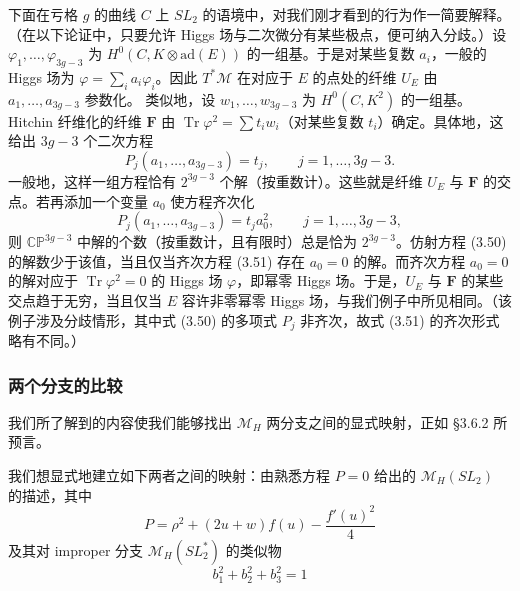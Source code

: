 \documentclass[11pt,a4paper]{article}
\newcommand{\Tr}{\operatorname{Tr}}
\begin{document}
下面在亏格 $g$ 的曲线 $C$ 上 $SL_2$ 的语境中，对我们刚才看到的行为作一简要解释。（在以下论证中，只要允许 Higgs 场与二次微分有某些极点，便可纳入分歧。）设 $\varphi_1,\dots,\varphi_{3g-3}$ 为 $H^0(C,K\otimes\mathrm{ad}(E))$ 的一组基。于是对某些复数 $a_i$，一般的 Higgs 场为 $\varphi=\sum_ia_i\varphi_i$。因此 $T^*\mathcal{M}$ 在对应于 $E$ 的点处的纤维 $U_E$ 由 $a_1,\dots,a_{3g-3}$ 参数化。
类似地，设 $w_1,\dots,w_{3g-3}$ 为 $H^0(C,K^2)$ 的一组基。Hitchin 纤维化的纤维 $\boldsymbol{F}$ 由 $\Tr\varphi^2=\sum t_iw_i$（对某些复数 $t_i$）确定。具体地，这给出 $3g-3$ 个二次方程
\begin{equation}\tag{3.50}
P_j(a_1,\dots,a_{3g-3})=t_j,\qquad j=1,\dots,3g-3.
\end{equation}
一般地，这样一组方程恰有 $2^{3g-3}$ 个解（按重数计）。这些就是纤维 $U_E$ 与 $\boldsymbol{F}$ 的交点。若再添加一个变量 $a_0$ 使方程齐次化
\begin{equation}\tag{3.51}
P_j(a_1,\dots,a_{3g-3})=t_ja_0^2,\qquad j=1,\dots,3g-3,
\end{equation}
则 $\mathbb{C}\mathbb{P}^{3g-3}$ 中解的个数（按重数计，且有限时）总是恰为 $2^{3g-3}$。仿射方程 (3.50) 的解数少于该值，当且仅当齐次方程 (3.51) 存在 $a_0=0$ 的解。而齐次方程 $a_0=0$ 的解对应于 $\Tr\varphi^2=0$ 的 Higgs 场 $\varphi$，即幂零 Higgs 场。于是，$U_E$ 与 $\boldsymbol{F}$ 的某些交点趋于无穷，当且仅当 $E$ 容许非零幂零 Higgs 场，与我们例子中所见相同。（该例子涉及分歧情形，其中式 (3.50) 的多项式 $P_j$ 非齐次，故式 (3.51) 的齐次形式略有不同。）

\subsubsection{两个分支的比较}

我们所了解到的内容使我们能够找出 $\mathcal{M}_H$ 两分支之间的显式映射，正如 §3.6.2 所预言。

我们想显式地建立如下两者之间的映射：由熟悉方程 $P=0$ 给出的 $\mathcal{M}_H(SL_2)$ 的描述，其中
\begin{equation}\tag{3.52}
P=\rho^2+(2u+w)f(u)-\frac{f'(u)^2}{4}
\end{equation}
及其对 improper 分支 $\mathcal{M}_H(SL_2^*)$ 的类似物
\begin{equation}\tag{3.53}
b_1^2+b_2^2+b_3^2=1
\end{equation}
\end{document}
